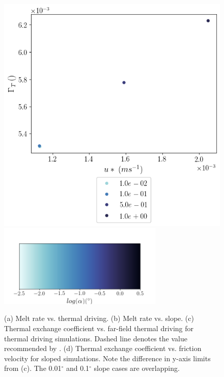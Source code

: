 \documentclass[draft]{agujournal2019}
\begin{document}
\begin{figure}[h!]
\begin{minipage}{0.5\textwidth}
        \vspace{0.7cm}
    \end{minipage}%
    \begin{minipage}{0.5\textwidth}
        \includegraphics[trim={0 3.4cm 0 0cm},clip,width=\textwidth]{Figures/gamma_T__us__dslope_tav12_tlim52.png}
        \centering
        \includegraphics[width=0.7\textwidth,trim={1cm 0cm 1cm 5cm}, clip]{Figures/colorbar_slope.png}
    \end{minipage}
    \caption{(a) Melt rate vs. thermal driving. (b) Melt rate vs. slope. (c) Thermal exchange coefficient vs. far-field thermal driving for thermal driving simulations. Dashed line denotes the value recommended by . (d) Thermal exchange coefficient vs. friction velocity for sloped simulations. Note the difference in y-axis limits from (c). The 0.01$^{\circ}$ and 0.1$^{\circ}$ slope cases are overlapping.}
    \label{fig:melt_sensitivity}
\end{figure}
\end{document}
